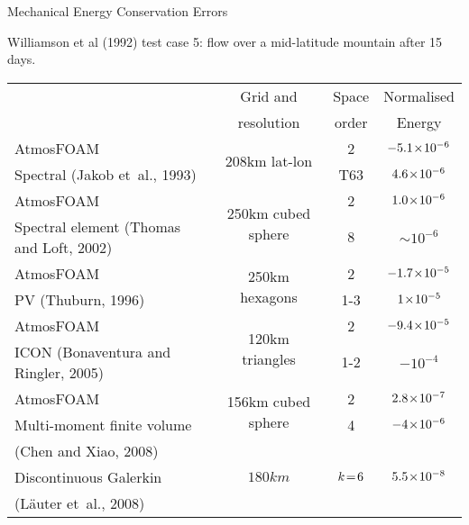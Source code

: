 \begin{slide}{Mechanical Energy Conservation Errors}

Williamson et al (1992) test case 5: flow over a mid-latitude mountain after 15 days.

\renewcommand{\arraystretch}{1.3}

\begin{tabular}{l|c|c|c}
         & Grid and & Space  & Normalised \\
         & resolution& order  &  Energy \\
\hline \hline
AtmosFOAM & \multirow{2}{*}{208km lat-lon} & 2 & $-5.1\negthinspace \times \negthinspace 10^{-6}$
\\
Spectral (Jakob et~al., 1993) &  & T63 & $4.6\negthinspace \times \negthinspace 10^{-6}$
\\
\hline
AtmosFOAM & \multirow{2}{*}{250km cubed sphere} & 2 & $1.0\negthinspace \times \negthinspace 10^{-6}$
\\
Spectral element (Thomas and Loft, 2002) &  & 8 & $\sim 10^{-6}$
\\ \hline
AtmosFOAM & \multirow{2}{*}{250km hexagons} & 2 & $-1.7\negthinspace \times \negthinspace 10^{-5}$
\\
PV (Thuburn, 1996) &  & 1-3 & $1\negthinspace \times \negthinspace 10^{-5}$
\\ \hline
AtmosFOAM & \multirow{2}{*}{120km triangles} & 2 & $-9.4\negthinspace \times \negthinspace 10^{-5}$
\\
ICON (Bonaventura and Ringler, 2005)  & & 1-2 & $-10^{-4}$
\\ \hline
AtmosFOAM & \multirow{2}{*}{156km cubed sphere} & 2 & $2.8\negthinspace \times \negthinspace 10^{-7}$
\\
Multi-moment finite volume  &  & 4 & $-4\negthinspace \times \negthinspace 10^{-6}$
\\
(Chen and Xiao, 2008) &&&
\\ \hline
Discontinuous Galerkin  & $180km$ & $k\negthinspace = \negthinspace 6$ & $5.5\negthinspace \times \negthinspace 10^{-8}$
\\
(L\"{a}uter et~al., 2008) &&&
\end{tabular}

\end{slide}